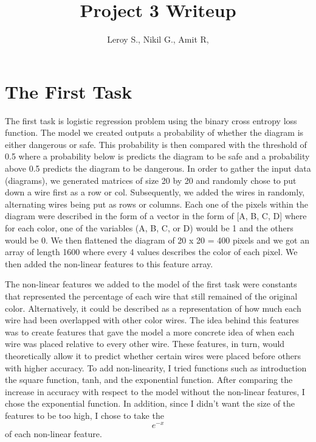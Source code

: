 \documentclass{article}
\title{Project 3 Writeup}
\author{Leroy S., Nikil G., Amit R,}
\begin{document}
\maketitle

\section*{The First Task}
    The first task is logistic regression problem using the binary cross entropy loss function. The model we created outputs a probability of whether the diagram is either dangerous or safe. 
    This probability is then compared with the threshold of 0.5 where a probability below is predicts the diagram to be safe and a probability above 0.5 predicts the diagram to be dangerous.
    In order to gather the input data (diagrams), we generated matrices of size 20 by 20 and randomly chose to put down a wire first as a row or col. Subsequently, we added the wires in randomly, 
    alternating wires being put as rows or columns. Each one of the pixels within the diagram were described in the form of a vector in the form of [A, B, C, D] where for each color, one of the variables (A, B, C, or D) 
    would be 1 and the others would be 0. We then flattened the diagram of 20 x 20 = 400 pixels and we got an array of length 1600 where every 4 values describes the color of each pixel. We then added the non-linear features
    to this feature array. \newline

    The non-linear features we added to the model of the first task were constants that represented the percentage of each wire that still remained of the original color. Alternatively, it could be described as a representation 
    of how much each wire had been overlapped with other color wires. The idea behind this features was to create features that gave the model a more concrete idea of when each wire was placed relative to every other wire. 
    These features, in turn, would theoretically allow it to predict whether certain wires were placed before others with higher accuracy. To add non-linearity, I tried functions such as introduction the square function, tanh, 
    and the exponential function. After comparing the increase in accuracy with respect to the model without the non-linear features, I chose the exponential function. In addition, since I didn't want the size of the features to be 
    too high, I chose to take the \[e^{-x}\] of each non-linear feature. 
\end{document}
